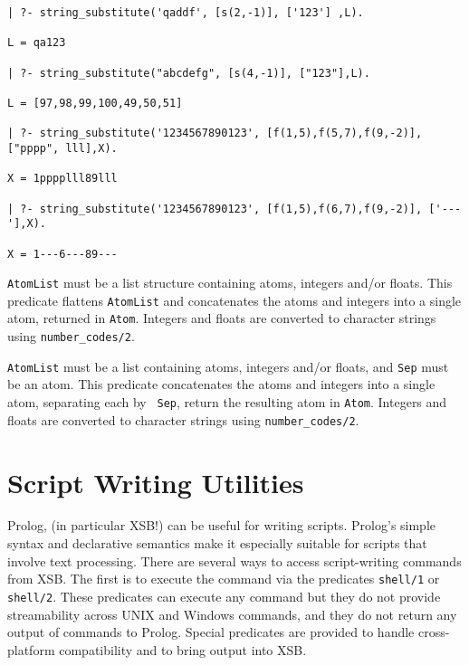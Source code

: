 \begin{description}
\begin{verbatim}
| ?- string_substitute('qaddf', [s(2,-1)], ['123'] ,L).

L = qa123

| ?- string_substitute("abcdefg", [s(4,-1)], ["123"],L).

L = [97,98,99,100,49,50,51]

| ?- string_substitute('1234567890123', [f(1,5),f(5,7),f(9,-2)], ["pppp", lll],X).

X = 1pppplll89lll

| ?- string_substitute('1234567890123', [f(1,5),f(6,7),f(9,-2)], ['---'],X).

X = 1---6---89---
\end{verbatim}


{\tt AtomList} must be a list structure containing atoms, integers
and/or floats.  This predicate flattens {\tt AtomList} and
concatenates the atoms and integers into a single atom, returned in
{\tt Atom}.  Integers and floats are converted to character strings
using {\tt number\_codes/2}.


{\tt AtomList} must be a list containing atoms, integers and/or
floats, and {\tt Sep} must be an atom.  This predicate concatenates
the atoms and integers into a single atom, separating each by {\tt
Sep}, return the resulting atom in {\tt Atom}.  Integers and floats
are converted to character strings using {\tt number\_codes/2}.
\end{description}


\section{Script Writing Utilities}

Prolog, (in particular XSB!) can be useful for writing scripts.
Prolog's simple syntax and declarative semantics make it especially
suitable for scripts that involve text processing.  There are several
ways to access script-writing commands from XSB.  The first is to
execute the command via the predicates {\tt shell/1} or {\tt shell/2}.
These predicates can execute any command but they do not provide
streamability across UNIX and Windows commands, and they do not return
any output of commands to Prolog.  Special predicates are provided to
handle cross-platform compatibility and to bring output into XSB.

